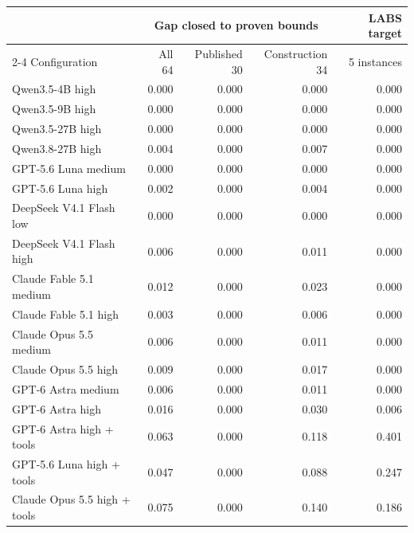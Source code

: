 \begin{tabular}{@{}lrrrr@{}}
\toprule
& \multicolumn{3}{c}{Gap closed to proven bounds} & LABS target \\
\cmidrule(lr){2-4}
Configuration & All 64 & Published 30 & Construction 34 & 5 instances \\
\midrule
Qwen3.5-4B high & 0.000 & 0.000 & 0.000 & 0.000 \\
Qwen3.5-9B high & 0.000 & 0.000 & 0.000 & 0.000 \\
Qwen3.5-27B high & 0.000 & 0.000 & 0.000 & 0.000 \\
Qwen3.8-27B high & 0.004 & 0.000 & 0.007 & 0.000 \\
GPT-5.6 Luna medium & 0.000 & 0.000 & 0.000 & 0.000 \\
GPT-5.6 Luna high & 0.002 & 0.000 & 0.004 & 0.000 \\
DeepSeek V4.1 Flash low & 0.000 & 0.000 & 0.000 & 0.000 \\
DeepSeek V4.1 Flash high & 0.006 & 0.000 & 0.011 & 0.000 \\
Claude Fable 5.1 medium & 0.012 & 0.000 & 0.023 & 0.000 \\
Claude Fable 5.1 high & 0.003 & 0.000 & 0.006 & 0.000 \\
Claude Opus 5.5 medium & 0.006 & 0.000 & 0.011 & 0.000 \\
Claude Opus 5.5 high & 0.009 & 0.000 & 0.017 & 0.000 \\
GPT-6 Astra medium & 0.006 & 0.000 & 0.011 & 0.000 \\
GPT-6 Astra high & 0.016 & 0.000 & 0.030 & 0.006 \\
\midrule
GPT-6 Astra high + tools & 0.063 & 0.000 & 0.118 & 0.401 \\
GPT-5.6 Luna high + tools & 0.047 & 0.000 & 0.088 & 0.247 \\
Claude Opus 5.5 high + tools & 0.075 & 0.000 & 0.140 & 0.186 \\
\bottomrule
\end{tabular}
